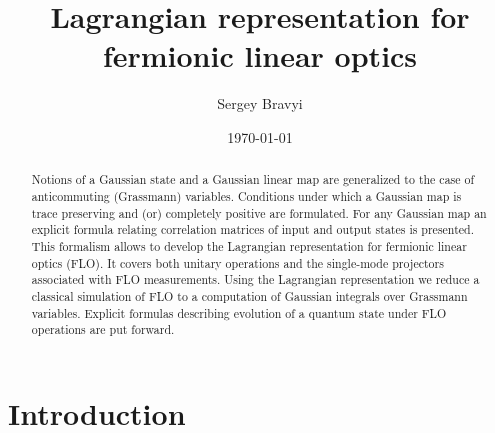 \documentclass[twocolumn,showpacs,preprintnumbers,superscriptaddress]{revtex4}
\begin{document}
\title{Lagrangian representation for fermionic linear optics}


\author{Sergey Bravyi}


\date{\today}



\begin{abstract}
Notions of a Gaussian state and a Gaussian linear map are
generalized to the case of anticommuting (Grassmann) variables.
Conditions under which a Gaussian map is trace preserving and (or) completely 
positive are formulated.
For any Gaussian map an explicit formula relating correlation matrices
of input and output states is presented.
This formalism allows to develop the Lagrangian representation for 
fermionic linear optics (FLO). It
covers both unitary operations and the  single-mode projectors
associated with FLO measurements. 
Using the Lagrangian  representation we reduce
a classical simulation of
FLO to a computation of Gaussian integrals over  Grassmann variables.
Explicit formulas describing evolution of a quantum state under FLO
operations are put forward. 
\end{abstract}



\maketitle

\section{Introduction}
\label{sec:intro}
\end{document}
